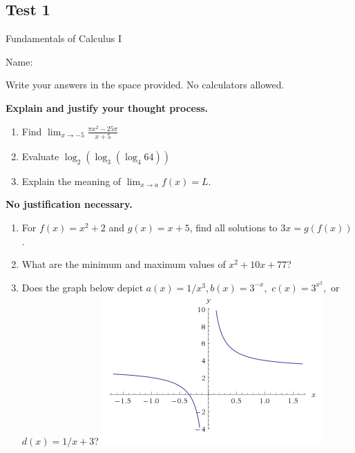 \documentclass[a4paper, 12pt]{article}
\title{}
\date{}
\newcommand{\bt}[1]{\textbf{#1}} %
\begin{document}
\begin{center}
\section*{Test 1}
Fundamentals of Calculus I\\
\end{center}
Name: \\
\vspace{1cm}



Write your answers in the space provided. No calculators allowed.

\bt{Explain and justify your thought process.}


    \begin{enumerate}
        \item Find $\lim_{x \rightarrow -5} \frac{\pi x^2-25\pi}{x+5}$
        \vspace{5cm}
        \item Evaluate $\log_2(\log_3(\log_4 64))$
        \vspace{5cm}
        \item Explain the meaning of $\lim_{x \rightarrow a} f(x) = L$.
        \vspace{5cm}
    \end{enumerate}

\newpage

\bt{No justification necessary.}

\begin{enumerate}[resume]
        \item For $f(x) = x^2 + 2$ and $g(x) = x + 5$, find all solutions to $3x = g(f(x))$.
        \vspace{2cm}
    \item What are the minimum and maximum values of $x^2 + 10x + 77$?
        \vspace{2cm}
    \item Does the graph below depict $a(x) = 1/x^3, b(x) = 3^{-x},$ $c(x) = 3^{x^2},$ or $d(x) = 1/x + 3$?
    \includegraphics[scale=0.7]{figures/1_over_x_3.png}
        \vspace{2cm}
\end{enumerate}
\end{document}
